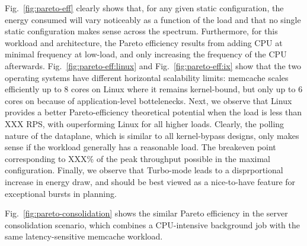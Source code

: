 Fig.~\ref{fig:pareto-eff} clearly shows that, for any given static
configuration, the energy consumed will vary noticeably as a function
of the load and that no single static configuration makes sense across
the spectrum.  Furthermore, for this workload and architecture, the
Pareto efficiency results from adding CPU at minimal frequency at
low-load, and only increasing the frequency of the CPU afterwards.
Fig.~\ref{fig:pareto-eff:linux} and Fig.~\ref{fig:pareto-eff:ix} show
that the two operating systems have different horizontal scalability
limits: memcache scales efficiently up to 8 cores on Linux where it
remains kernel-bound, but only up to 6 cores on \ix because of
application-level bottelenecks.  Next, we observe that Linux provides
a better Pareto-efficiency theoretical potential when the load is less
than XXX RPS, with \ix ouperforming Linux for all higher loads.
Clearly, the polling nature of the \ix dataplane, which is similar to
all kernel-bypass designs, only makes sense if the workload generally
has a reasonable load.  The breakeven point corresponding to XXX\% of
the peak throughput possible in the maximal configuration.  Finally,
we observe that Turbo-mode leads to a disprportional increase in
energy draw, and should be best viewed as a nice-to-have feature for
exceptional bursts in planning.


Fig.~\ref{fig:pareto-consolidation} shows the similar Pareto
efficiency in the server consolidation scenario, which combines a
CPU-intensive background job with the same latency-sensitive memcache
workload.

